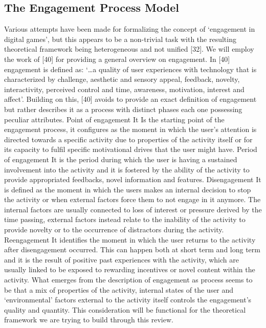 \subsection{The Engagement Process Model}
\label{eng_proc_model}
Various attempts have been made for formalizing the concept of ‘engagement in digital games’, but this appears to be a non-trivial task with the resulting theoretical framework being heterogeneous and not unified [32]. We will employ the work of [40] for providing a general overview on engagement. In [40] engagement is defined as:
‘…a quality of user experiences with technology that is characterized by challenge, aesthetic and sensory appeal, feedback, novelty, interactivity, perceived control and time, awareness, motivation, interest and affect’.
Building on this, [40] avoids to provide an exact definition of engagement but rather describes it as a process with distinct phases each one possessing peculiar attributes.
Point of engagement
It Is the starting point of the engagement process, it configures as the moment in which the user’s attention is directed towards a specific activity due to properties of the activity itself or for its capacity to fulfil specific motivational drives that the user might have.
Period of engagement
It is the period during which the user is having a sustained involvement into the activity and it is fostered by the ability of the activity to provide appropriated feedbacks, novel information and features.
Disengagement
It is defined as the moment in which the users makes an internal decision to stop the activity or when external factors force them to not engage in it anymore. The internal factors are usually connected to loss of interest or pressure derived by the time passing, external factors instead relate to the inability of the activity to provide novelty or to the occurrence of distractors during the activity.
Reengagement
It identifies the moment in which the user returns to the activity after disengagement occurred. This can happen both at short term and long term and it is the result of positive past experiences with the activity, which are usually linked to be exposed to rewarding incentives or novel content within the activity.
What emerges from the description of engagement as process seems to be that a mix of properties of the activity, internal states of the user and ‘environmental’ factors external to the activity itself controls the engagement’s quality and quantity. This consideration will be functional for the theoretical framework we are trying to build through this review.

